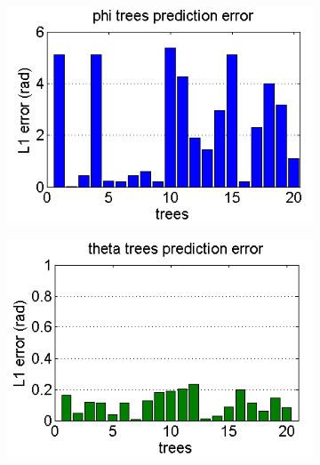 \documentclass[annual]{acmsiggraph}
\begin{document}
\begin{figure}[h]
\begin{subfigure}[c]{0.5\columnwidth} \includegraphics[width=\textwidth]{images/eval_phiTrees_L1dist.png} \end{subfigure}%
\begin{subfigure}[c]{0.5\columnwidth} \includegraphics[width=\textwidth]{images/eval_thetaTrees_L1dist.png} \end{subfigure}\\%

\end{figure}
\end{document}
